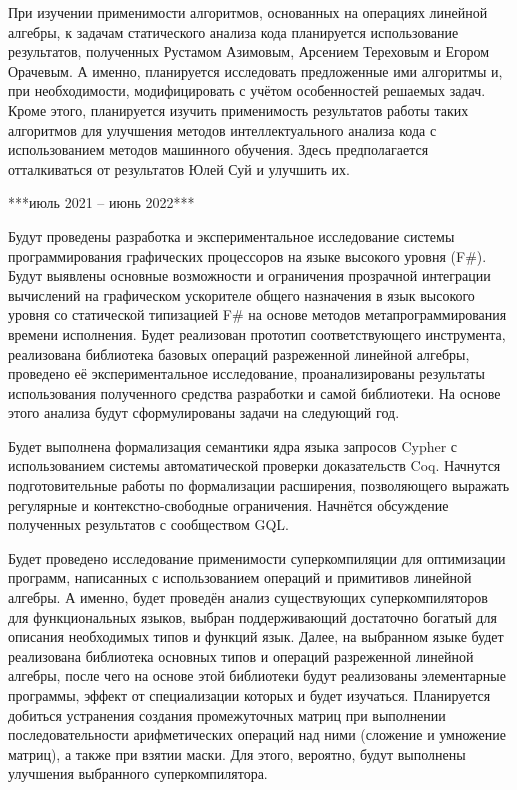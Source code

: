 \documentclass[12pt]{article}  %
\theoremstyle{remark}
\begin{document}
При изучении применимости алгоритмов, основанных на операциях линейной алгебры, к задачам статического анализа кода планируется использование результатов, полученных Рустамом Азимовым, Арсением Тереховым и Егором Орачевым. А именно, планируется исследовать предложенные ими алгоритмы и, при необходимости, модифицировать с учётом особенностей решаемых задач. Кроме этого, планируется изучить применимость результатов работы таких алгоритмов для улучшения методов интеллектуального анализа кода с использованием методов машинного обучения. Здесь предполагается отталкиваться от результатов Юлей Суй и улучшить их.


***июль 2021 -- июнь 2022***

Будут проведены разработка и экспериментальное исследование системы программирования графических процессоров на языке высокого уровня (F#). Будут выявлены основные возможности и ограничения прозрачной интеграции вычислений на графическом ускорителе общего назначения в язык высокого уровня со статической типизацией F# на основе методов метапрограммирования времени исполнения. Будет реализован прототип соответствующего инструмента, реализована библиотека базовых операций разреженной линейной алгебры, проведено её экспериментальное исследование, проанализированы результаты использования полученного средства разработки и самой библиотеки. На основе этого анализа будут сформулированы задачи на следующий год. 

Будет выполнена формализация семантики ядра языка запросов Cypher с использованием системы автоматической проверки доказательств Coq. Начнутся подготовительные работы по формализации расширения, позволяющего выражать регулярные и контекстно-свободные ограничения. Начнётся обсуждение полученных результатов с сообществом GQL.

Будет проведено исследование применимости суперкомпиляции для оптимизации программ, написанных с использованием операций и примитивов линейной алгебры. А именно, будет проведён анализ существующих суперкомпиляторов для функциональных языков, выбран поддерживающий достаточно богатый для описания необходимых типов и функций язык. Далее, на выбранном языке будет реализована библиотека основных типов и операций разреженной линейной алгебры, после чего на основе этой библиотеки будут реализованы элементарные программы, эффект от специализации которых и будет изучаться. Планируется добиться устранения создания промежуточных матриц при выполнении последовательности арифметических операций над ними (сложение и умножение матриц), а также при взятии маски. Для этого, вероятно, будут выполнены улучшения выбранного суперкомпилятора.
\end{document}

